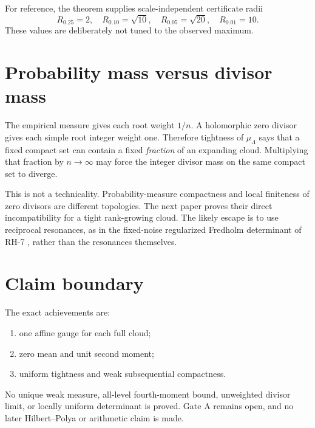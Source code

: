 \documentclass[11pt]{article}
\theoremstyle{remark}\newtheorem{remark}[theorem]{Remark}
\begin{document}
For reference, the theorem supplies scale-independent certificate radii
\[
 R_{0.25}=2,\quad R_{0.10}=\sqrt{10},\quad
 R_{0.05}=\sqrt{20},\quad R_{0.01}=10.
\]
These values are deliberately not tuned to the observed maximum.

\section{Probability mass versus divisor mass}

The empirical measure gives each root weight $1/n$. A holomorphic zero
divisor gives each simple root integer weight one. Therefore tightness of
$\mu_\Lambda$ says that a fixed compact set can contain a fixed
\emph{fraction} of an expanding cloud. Multiplying that fraction by
$n\to\infty$ may force the integer divisor mass on the same compact set to
diverge.

This is not a technicality. Probability-measure compactness and local
finiteness of zero divisors are different topologies. The next paper proves
their direct incompatibility for a tight rank-growing cloud. The likely
escape is to use reciprocal resonances, as in the fixed-noise regularized
Fredholm determinant of RH-7 \citep{WangRH7}, rather than the resonances
themselves.

\section{Claim boundary}

The exact achievements are:
\begin{enumerate}[leftmargin=2em]
\item one affine gauge for each full cloud;
\item zero mean and unit second moment;
\item uniform tightness and weak subsequential compactness.
\end{enumerate}
No unique weak measure, all-level fourth-moment bound, unweighted divisor
limit, or locally uniform determinant is proved. Gate A remains open, and no
later Hilbert--Polya or arithmetic claim is made.



\end{document}
